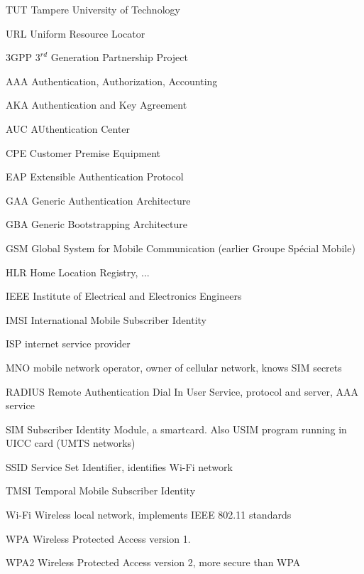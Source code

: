 \documentclass[12pt,a4paper,english]{tutthesis}
\begin{document}
\begin{otherlanguage}{english}
\begin{termlist}
\item [TUT]    Tampere University of Technology
\item [URL]    Uniform Resource Locator
\item[3GPP] $3^{rd}$ Generation Partnership Project
\item[AAA] Authentication, Authorization, Accounting
\item[AKA] Authentication and Key Agreement %
\item[AUC] AUthentication Center
\item[CPE] Customer Premise Equipment %
\item[EAP] Extensible Authentication Protocol %
\item[GAA] Generic Authentication Architecture %
\item[GBA] Generic Bootstrapping Architecture
\item[GSM] Global System for Mobile Communication (earlier Groupe Spécial Mobile)
\item[HLR] Home Location Registry, ...
\item[IEEE] Institute of Electrical and Electronics Engineers
\item[IMSI] International Mobile Subscriber Identity
\item[ISP] internet service provider
\item[MNO] mobile network operator, owner of cellular network, knows SIM secrets
\item[RADIUS] Remote Authentication Dial In User Service, protocol and server,  AAA service 
\item[SIM]  Subscriber Identity Module, a smartcard. Also USIM program running in UICC card (UMTS networks)
\item[SSID] Service Set Identifier, identifies Wi-Fi network
\item[TMSI] Temporal Mobile Subscriber Identity
\item[Wi-Fi] Wireless local network, implements IEEE 802.11 standards
\item[WPA] Wireless Protected Access version 1.
\item[WPA2] Wireless Protected Access version 2, more secure than WPA
\end{termlist} 



\end{otherlanguage}
\end{document}
